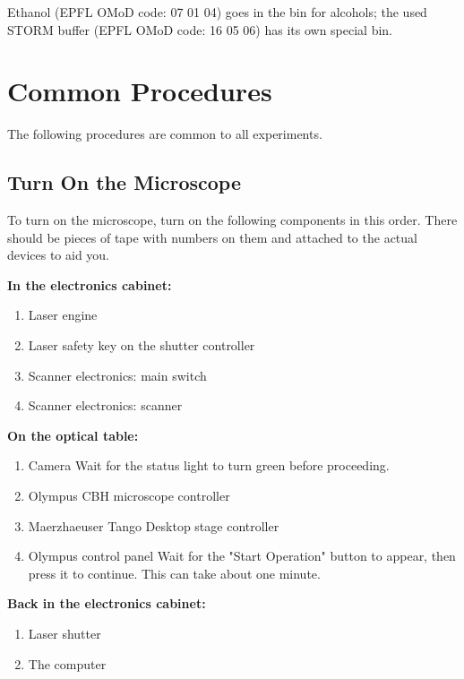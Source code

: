 \documentclass[10pt,a4paper,oneside]{book}
\begin{document}
Ethanol (EPFL OMoD code: 07 01 04) goes in the bin for alcohols; the used STORM buffer (EPFL OMoD code: 16 05 06) has its own special bin.

\section{Common Procedures}

The following procedures are common to all experiments.

\subsection{Turn On the Microscope}\label{sec:startup}

To turn on the microscope, turn on the following components in this order. There should be pieces of tape with numbers on them and attached to the actual devices to aid you.

\textbf{In the electronics cabinet:}

\begin{enumerate}
    \item Laser engine
    \item Laser safety key on the shutter controller
    \item Scanner electronics: main switch
    \item Scanner electronics: scanner
\end{enumerate}

\textbf{On the optical table:}

\begin{enumerate}
    \item Camera \newline Wait for the status light to turn green before proceeding.
    \item Olympus CBH microscope controller
    \item Maerzhaeuser Tango Desktop stage controller
    \item Olympus control panel \newline Wait for the "Start Operation" button to appear, then press it to continue. This can take about one minute.
\end{enumerate}

\textbf{Back in the electronics cabinet:}

\begin{enumerate}
    \item Laser shutter
    \item The computer
\end{enumerate}
\end{document}
